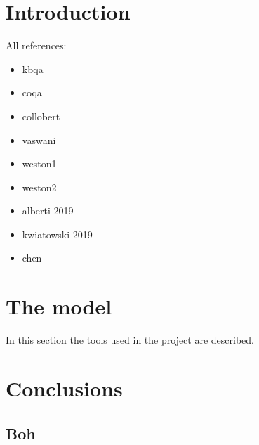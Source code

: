 \documentclass[12pt,a4paper,hidelinks]{article}
\begin{document}

\tableofcontents
\thispagestyle{empty}
\newpage
\setcounter{page}{1}


\section{Introduction}\label{sec:intro}

All references:
\begin{itemize}
  \item kbqa~\cite{kbqa}    
  \item coqa~\cite{coqa}
  \item collobert~\cite{Collobert}
  \item vaswani~\cite{vaswani}
  \item weston1~\cite{weston-tracking}
  \item weston2~\cite{weston-reading}
  \item alberti 2019~\cite{alberti}
  \item kwiatowski 2019~\cite{kwiatowski}
  \item chen~\cite{chen}
\end{itemize}

\section{The model}\label{sec:model}
In this section the tools used in the project are described.

\section{Conclusions}\label{sec:conclusions}

\subsection{Boh}



\end{document}
